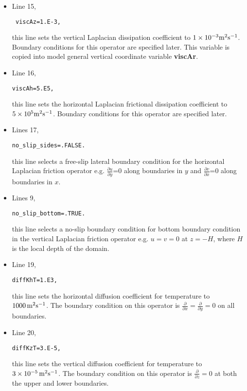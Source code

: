 {\begin{itemize}
\item Line 15, 
\begin{verbatim} viscAz=1.E-3, \end{verbatim}
this line sets the vertical Laplacian dissipation coefficient to
$1 \times 10^{-3} {\rm m^{2}s^{-1}}$. Boundary conditions
for this operator are specified later. This variable is copied into
model general vertical coordinate variable {\bf viscAr}.


\item Line 16, 
\begin{verbatim}
viscAh=5.E5,
\end{verbatim} 
this line sets the horizontal Laplacian frictional dissipation coefficient to
$5 \times 10^{5} {\rm m^{2}s^{-1}}$. Boundary conditions
for this operator are specified later.

\item Lines 17,
\begin{verbatim}
no_slip_sides=.FALSE.
\end{verbatim}
this line selects a free-slip lateral boundary condition for
the horizontal Laplacian friction operator 
e.g. $\frac{\partial u}{\partial y}$=0 along boundaries in $y$ and
$\frac{\partial v}{\partial x}$=0 along boundaries in $x$.

\item Lines 9,
\begin{verbatim}
no_slip_bottom=.TRUE.
\end{verbatim}
this line selects a no-slip boundary condition for bottom
boundary condition in the vertical Laplacian friction operator 
e.g. $u=v=0$ at $z=-H$, where $H$ is the local depth of the domain.

\item Line 19,
\begin{verbatim}
diffKhT=1.E3,
\end{verbatim}
this line sets the horizontal diffusion coefficient for temperature
to $1000\,{\rm m^{2}s^{-1}}$. The boundary condition on this
operator is $\frac{\partial}{\partial x}=\frac{\partial}{\partial y}=0$ on
all boundaries.

\item Line 20,
\begin{verbatim}
diffKzT=3.E-5,
\end{verbatim}
this line sets the vertical diffusion coefficient for temperature
to $3 \times 10^{-5}\,{\rm m^{2}s^{-1}}$. The boundary 
condition on this operator is $\frac{\partial}{\partial z}=0$ at both
the upper and lower boundaries.


\end{itemize}}
